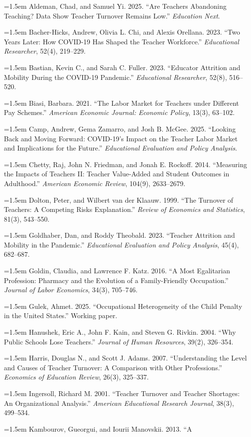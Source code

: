 \documentclass[11pt,a4paper]{article}
\begin{document}
\newcommand{\bibentry}[1]{\par\noindent\hangindent=1.5em #1\par}
{\footnotesize\setlength{\parskip}{4pt}
\bibentry{Aldeman, Chad, and Samuel Yi. 2025. ``Are Teachers Abandoning
Teaching? Data Show Teacher Turnover Remains Low.'' \textit{Education
Next}.}
\bibentry{Bacher-Hicks, Andrew, Olivia L. Chi, and Alexis Orellana. 2023.
``Two Years Later: How COVID-19 Has Shaped the Teacher Workforce.''
\textit{Educational Researcher}, 52(4), 219--229.}
\bibentry{Bastian, Kevin C., and Sarah C. Fuller. 2023. ``Educator
Attrition and Mobility During the COVID-19 Pandemic.''
\textit{Educational Researcher}, 52(8), 516--520.}
\bibentry{Biasi, Barbara. 2021. ``The Labor Market for Teachers under
Different Pay Schemes.'' \textit{American Economic Journal: Economic
Policy}, 13(3), 63--102.}
\bibentry{Camp, Andrew, Gema Zamarro, and Josh B. McGee. 2025. ``Looking
Back and Moving Forward: COVID-19's Impact on the Teacher Labor Market and
Implications for the Future.'' \textit{Educational Evaluation and Policy
Analysis}.}
\bibentry{Chetty, Raj, John N. Friedman, and Jonah E. Rockoff. 2014.
``Measuring the Impacts of Teachers II: Teacher Value-Added and Student
Outcomes in Adulthood.'' \textit{American Economic Review}, 104(9),
2633--2679.}
\bibentry{Dolton, Peter, and Wilbert van der Klaauw. 1999. ``The
Turnover of Teachers: A Competing Risks Explanation.'' \textit{Review of
Economics and Statistics}, 81(3), 543--550.}
\bibentry{Goldhaber, Dan, and Roddy Theobald. 2023. ``Teacher Attrition
and Mobility in the Pandemic.'' \textit{Educational Evaluation and Policy
Analysis}, 45(4), 682--687.}
\bibentry{Goldin, Claudia, and Lawrence F. Katz. 2016. ``A Most
Egalitarian Profession: Pharmacy and the Evolution of a Family-Friendly
Occupation.'' \textit{Journal of Labor Economics}, 34(3), 705--746.}
\bibentry{Gulek, Ahmet. 2025. ``Occupational Heterogeneity of the Child
Penalty in the United States.'' Working paper.}
\bibentry{Hanushek, Eric A., John F. Kain, and Steven G. Rivkin. 2004.
``Why Public Schools Lose Teachers.'' \textit{Journal of Human Resources},
39(2), 326--354.}
\bibentry{Harris, Douglas N., and Scott J. Adams. 2007. ``Understanding
the Level and Causes of Teacher Turnover: A Comparison with Other
Professions.'' \textit{Economics of Education Review}, 26(3), 325--337.}
\bibentry{Ingersoll, Richard M. 2001. ``Teacher Turnover and Teacher
Shortages: An Organizational Analysis.'' \textit{American Educational
Research Journal}, 38(3), 499--534.}
\bibentry{Kambourov, Gueorgui, and Iourii Manovskii. 2013. ``A
}}
\end{document}
